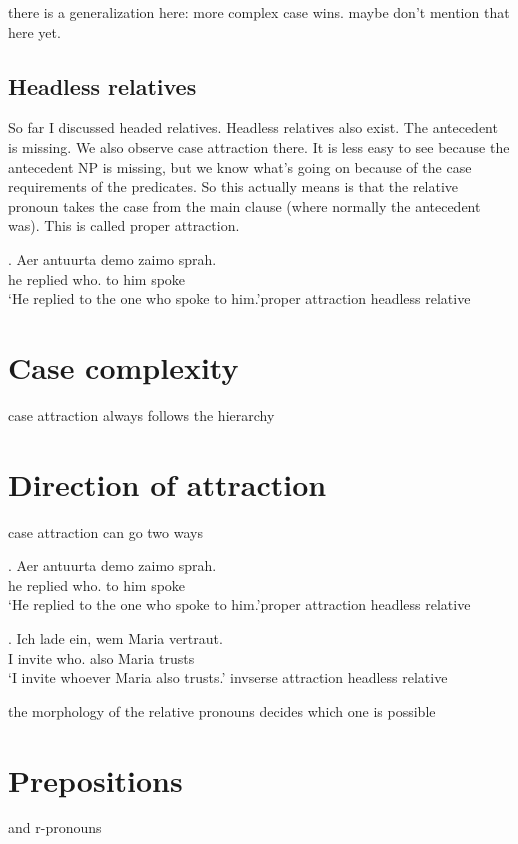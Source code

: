 there is a generalization here: more complex case wins. maybe don't mention that here yet.


\subsection{Headless relatives}

So far I discussed headed relatives. Headless relatives also exist. The antecedent is missing. We also observe case attraction there. It is less easy to see because the antecedent NP is missing, but we know what's going on because of the case requirements of the predicates. So this actually means is that the relative pronoun takes the case from the main clause (where normally the antecedent was). This is called proper attraction.

\exg. Aer antuurta demo zaimo sprah.\\
he replied who. {to him} spoke\\
`He replied to the one who spoke to him.'\hfill proper attraction headless relative



\section{Case complexity}

case attraction always follows the hierarchy



\section{Direction of attraction}

case attraction can go two ways

\exg. Aer antuurta demo zaimo sprah.\\
he replied who. {to him} spoke\\
`He replied to the one who spoke to him.'\hfill proper attraction headless relative

\exg. Ich {lade ein}, wem Maria vertraut. \\
I invite who. also Maria trusts\\
`I invite whoever Maria also trusts.' \hfill invserse attraction headless relative

the morphology of the relative pronouns decides which one is possible



\section{Prepositions}

and r-pronouns
